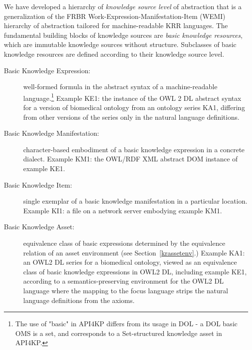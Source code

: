 \documentclass[runningheads]{llncs}
\begin{document}

We have developed a hierarchy of \emph{knowledge source level} of abstraction that is a generalization of the FRBR \cite{FRBR} Work-Expression-Manifestation-Item (WEMI) hierarchy of abstraction tailored for machine-readable KRR languages. The fundamental building blocks of knowledge sources are \emph{basic knowledge resources}, which are immutable knowledge sources without structure.
Subclasses of basic knowledge resources are defined according to their knowledge source level. 
\begin{description}
\item[Basic Knowledge Expression:] well-formed formula in the abstract syntax of a machine-readable language.\footnote{The use of "basic" in API4KP differs from its usage in DOL - a DOL basic OMS is a set, and corresponds to a Set-structured knowledge asset in API4KP.}
Example KE1: the instance of the OWL 2 DL abstract syntax for a version of biomedical ontology from an ontology series KA1, differing from other versions of the series only in the natural language definitions.
\item[Basic Knowledge Manifestation:] character-based embodiment of a basic knowledge expression in a concrete dialect. Example KM1: the OWL/RDF XML abstract DOM instance of example KE1.
\item[Basic Knowledge Item:] single exemplar of a basic knowledge manifestation in a particular location. Example KI1: a file on a network server embodying example KM1.
\item[Basic Knowledge Asset:] equivalence class of basic expressions determined by the equivalence relation of an asset environment (see Section~\ref{krassetenv}.) Example KA1: an OWL2 DL series for a biomedical ontology, viewed as an equivalence class of basic knowledge expressions in OWL2 DL, including example KE1, according to a semantics-preserving environment for the OWL2 DL language where the mapping to the focus language strips the natural language definitions from the axioms.
\end{description}
\end{document}
